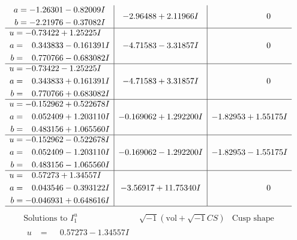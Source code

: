 \documentclass[1p]{elsarticle_modified}
\theoremstyle{definition}
\newcommand{\I}{\sqrt{-1}}
\begin{document}
$$\begin{array}{c|c|c}
\begin{aligned}
a &= -1.26301 - 0.82009 I \\
b &= -2.21976 - 0.37082 I\end{aligned}
 & -2.96488 + 2.11966 I & \phantom{-0.000000 } 0 \\ \hline\begin{aligned}
u &= -0.73422 + 1.25225 I \\
a &= \phantom{-}0.343833 - 0.161391 I \\
b &= \phantom{-}0.770766 - 0.683082 I\end{aligned}
 & -4.71583 - 3.31857 I & \phantom{-0.000000 } 0 \\ \hline\begin{aligned}
u &= -0.73422 - 1.25225 I \\
a &= \phantom{-}0.343833 + 0.161391 I \\
b &= \phantom{-}0.770766 + 0.683082 I\end{aligned}
 & -4.71583 + 3.31857 I & \phantom{-0.000000 } 0 \\ \hline\begin{aligned}
u &= -0.152962 + 0.522678 I \\
a &= \phantom{-}0.052409 + 1.203110 I \\
b &= \phantom{-}0.483156 + 1.065560 I\end{aligned}
 & -0.169062 + 1.292200 I & -1.82953 + 1.55175 I \\ \hline\begin{aligned}
u &= -0.152962 - 0.522678 I \\
a &= \phantom{-}0.052409 - 1.203110 I \\
b &= \phantom{-}0.483156 - 1.065560 I\end{aligned}
 & -0.169062 - 1.292200 I & -1.82953 - 1.55175 I \\ \hline\begin{aligned}
u &= \phantom{-}0.57273 + 1.34557 I \\
a &= \phantom{-}0.043546 - 0.393122 I \\
b &= -0.046931 + 0.648616 I\end{aligned}
 & -3.56917 + 11.75340 I & \phantom{-0.000000 } 0\\
 \hline 
 \end{array}$$\newpage$$\begin{array}{c|c|c}  
\text{Solutions to }I^u_{1}& \I (\text{vol} + \sqrt{-1}CS) & \text{Cusp shape}\\
 \hline 
\begin{aligned}
u &= \phantom{-}0.57273 - 1.34557 I \\

\end{aligned}
\end{array}$$
\end{document}
